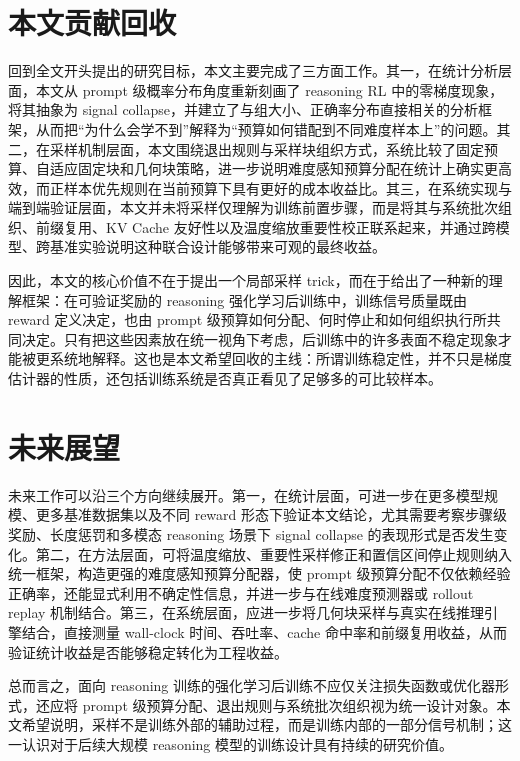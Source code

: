 \section{本文贡献回收}

回到全文开头提出的研究目标，本文主要完成了三方面工作。其一，在统计分析层面，本文从 prompt 级概率分布角度重新刻画了 reasoning RL 中的零梯度现象，将其抽象为 signal collapse，并建立了与组大小、正确率分布直接相关的分析框架，从而把“为什么会学不到”解释为“预算如何错配到不同难度样本上”的问题。其二，在采样机制层面，本文围绕退出规则与采样块组织方式，系统比较了固定预算、自适应固定块和几何块策略，进一步说明难度感知预算分配在统计上确实更高效，而正样本优先规则在当前预算下具有更好的成本收益比。其三，在系统实现与端到端验证层面，本文并未将采样仅理解为训练前置步骤，而是将其与系统批次组织、前缀复用、KV Cache 友好性以及温度缩放重要性校正联系起来，并通过跨模型、跨基准实验说明这种联合设计能够带来可观的最终收益。

因此，本文的核心价值不在于提出一个局部采样 trick，而在于给出了一种新的理解框架：在可验证奖励的 reasoning 强化学习后训练中，训练信号质量既由 reward 定义决定，也由 prompt 级预算如何分配、何时停止和如何组织执行所共同决定。只有把这些因素放在统一视角下考虑，后训练中的许多表面不稳定现象才能被更系统地解释。这也是本文希望回收的主线：所谓训练稳定性，并不只是梯度估计器的性质，还包括训练系统是否真正看见了足够多的可比较样本。

\section{未来展望}

未来工作可以沿三个方向继续展开。第一，在统计层面，可进一步在更多模型规模、更多基准数据集以及不同 reward 形态下验证本文结论，尤其需要考察步骤级奖励、长度惩罚和多模态 reasoning 场景下 signal collapse 的表现形式是否发生变化。第二，在方法层面，可将温度缩放、重要性采样修正和置信区间停止规则纳入统一框架，构造更强的难度感知预算分配器，使 prompt 级预算分配不仅依赖经验正确率，还能显式利用不确定性信息，并进一步与在线难度预测器或 rollout replay 机制结合。第三，在系统层面，应进一步将几何块采样与真实在线推理引擎结合，直接测量 wall-clock 时间、吞吐率、cache 命中率和前缀复用收益，从而验证统计收益是否能够稳定转化为工程收益。

总而言之，面向 reasoning 训练的强化学习后训练不应仅关注损失函数或优化器形式，还应将 prompt 级预算分配、退出规则与系统批次组织视为统一设计对象。本文希望说明，采样不是训练外部的辅助过程，而是训练内部的一部分信号机制；这一认识对于后续大规模 reasoning 模型的训练设计具有持续的研究价值。
